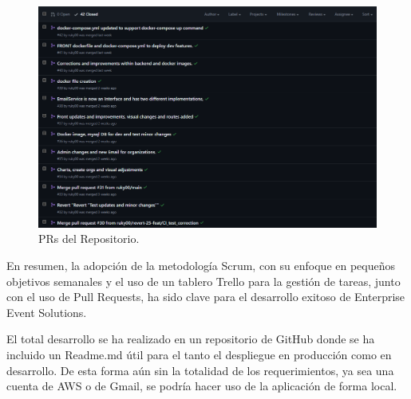 \begin{figure}[h]
    \centering
    \includegraphics[width=\linewidth]{PRs.png}
    \caption{PRs del Repositorio.}
    \label{fig:metodologias2}
\end{figure}

En resumen, la adopción de la metodología Scrum, con su enfoque en pequeños objetivos semanales y el uso de un tablero Trello para la gestión de tareas, 
junto con el uso de Pull Requests, ha sido clave para el desarrollo exitoso de Enterprise Event Solutions.

El total desarrollo se ha realizado en un repositorio de GitHub donde se ha incluido un Readme.md útil para el tanto el despliegue en producción como en desarrollo. De esta forma
aún sin la totalidad de los requerimientos, ya sea una cuenta de AWS o de Gmail, se podría hacer uso de la aplicación de forma local.


